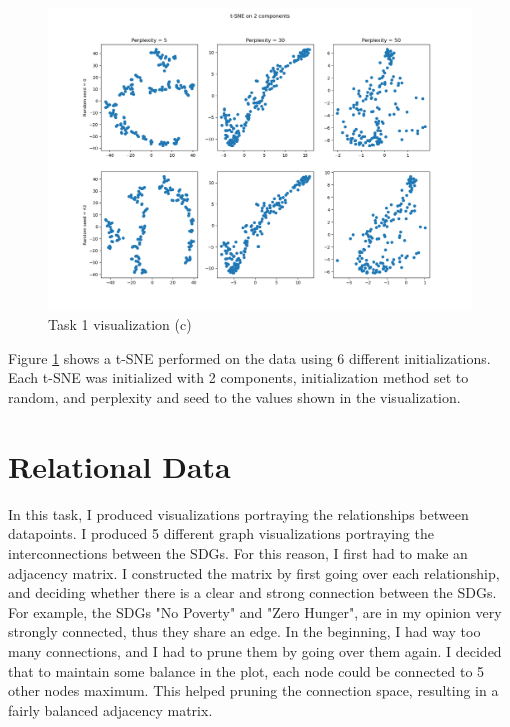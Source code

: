 \documentclass[11pt,a4paper,titlepage]{article}
\begin{document}
\begin{figure}[h!]
    \centering
    \includegraphics[width=1.0\linewidth]{reports/assignment-4/imgs/tsne.png}
    \caption{Task 1 visualization (c)}
    \label{fig:tsne}
\end{figure}

Figure \ref{fig:tsne} shows a t-SNE performed on the data using 6 different initializations. Each t-SNE was initialized with 2 components, initialization method set to random, and perplexity and seed to the values shown in the visualization.

\newpage

\section{Relational Data}

In this task, I produced visualizations portraying the relationships between datapoints. I produced 5 different graph visualizations portraying the interconnections between the SDGs. For this reason, I first had to make an adjacency matrix. I constructed the matrix by first going over each relationship, and deciding whether there is a clear and strong connection between the SDGs. For example, the SDGs "No Poverty" and "Zero Hunger", are in my opinion very strongly connected, thus they share an edge. In the beginning, I had way too many connections, and I had to prune them by going over them again. I decided that to maintain some balance in the plot, each node could be connected to 5 other nodes maximum. This helped pruning the connection space, resulting in a fairly balanced adjacency matrix.
\end{document}
